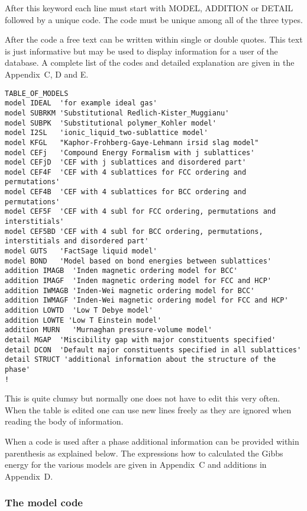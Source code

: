 \documentclass[12pt]{article}
\begin{document}
After this keyword each line must start with MODEL, ADDITION or DETAIL
followed by a unique code.  The code must be unique among all of the
three types.

After the code a free text can be written within single or double
quotes.  This text is just informative but may be used to display
information for a user of the database.  A complete list of the codes
and detailed explanation are given in the Appendix~C, D and E.

{\small
\begin{verbatim}
TABLE_OF_MODELS
model IDEAL  'for example ideal gas'
model SUBRKM 'Substitutional Redlich-Kister_Muggianu'
model SUBPK  'Substitutional polymer_Kohler model'
model I2SL   'ionic_liquid_two-sublattice model'
model KFGL   "Kaphor-Frohberg-Gaye-Lehmann irsid slag model"  
model CEFj   'Compound Energy Formalism with j sublattices'
model CEFjD  'CEF with j sublattices and disordered part'
model CEF4F  'CEF with 4 sublattices for FCC ordering and permutations'
model CEF4B  'CEF with 4 sublattices for BCC ordering and permutations'
model CEF5F  'CEF with 4 subl for FCC ordering, permutations and interstitials'
model CEF5BD 'CEF with 4 subl for BCC ordering, permutations, interstitials and disordered part'
model GUTS   'FactSage liquid model'
model BOND   'Model based on bond energies between sublattices'
addition IMAGB  'Inden magnetic ordering model for BCC'
addition IMAGF  'Inden magnetic ordering model for FCC and HCP'
addition IWMAGB 'Inden-Wei magnetic ordering model for BCC'
addition IWMAGF 'Inden-Wei magnetic ordering model for FCC and HCP'
addition LOWTD  'Low T Debye model'
addition LOWTE 'Low T Einstein model'
addition MURN   'Murnaghan pressure-volume model'
detail MGAP  'Miscibility gap with major constituents specified'
detail DCON  'Default major constituents specified in all sublattices'
detail STRUCT 'additional information about the structure of the phase'
!
\end{verbatim}
}

This is quite clumsy but normally one does not have to edit this
very often.  When the table is edited one can use new lines freely as
they are ignored when reading the body of information.

When a code is used after a phase additional information
can be provided within parenthesis as explained below.  The
expressions how to calculated the Gibbs energy for the various models
are given in Appendix~C and additions in Appendix~D.

\subsubsection{The model code}\label{sec:modcode}
\end{document}
